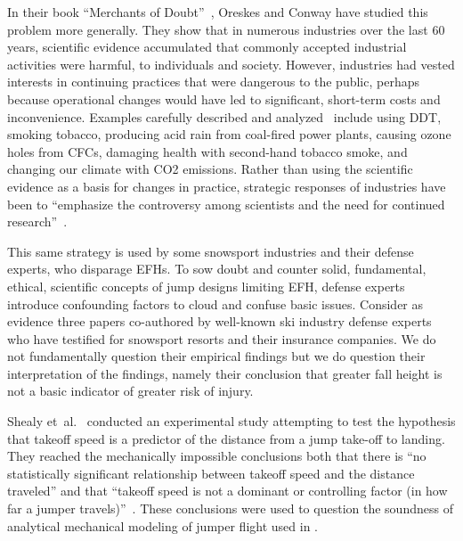 \documentclass{article}
\begin{document}
In their book ``Merchants of Doubt''~\cite{Oreskes2010}, Oreskes and Conway
have studied this problem more generally. They show that in numerous industries
over the last 60 years, scientific evidence accumulated that commonly accepted
industrial activities were harmful, to individuals and society. However,
industries had vested interests in continuing practices that were dangerous to
the public, perhaps because operational changes would have led to significant,
short-term costs and inconvenience. Examples carefully described and
analyzed~\cite{Oreskes2010} include using DDT, smoking tobacco, producing acid
rain from coal-fired power plants, causing ozone holes from  CFCs, damaging
health with second-hand tobacco smoke, and changing our climate with CO2
emissions. Rather than using the scientific evidence as a basis for changes in
practice, strategic responses of industries have been to ``emphasize the
controversy among scientists and the need for continued
research''~\cite{Oreskes2010}.

This same strategy is used by some snowsport industries and their defense
experts, who disparage EFHs.  To sow doubt and counter solid, fundamental,
ethical, scientific concepts of jump designs limiting EFH, defense experts
introduce confounding factors to cloud and confuse basic issues. Consider as
evidence three papers \cite{Shealy2010,Shealy2015,Scher2015} co-authored by
well-known ski industry defense experts who have testified for snowsport
resorts and their insurance companies. We do not fundamentally question their
empirical findings but we do question their interpretation of the findings,
namely their conclusion that greater fall height is not a basic indicator of
greater risk of injury.

Shealy et~al.~\cite{Shealy2010} conducted an experimental study attempting to
test the hypothesis that takeoff speed is a predictor of the distance from a
jump take-off to landing. They reached the mechanically impossible conclusions
both that there is ``no statistically significant relationship between takeoff
speed and the distance traveled'' and that ``takeoff speed is not a dominant or
controlling factor (in how far a jumper travels)''~\cite{Shealy2010}. These
conclusions were used to question the soundness of analytical mechanical
modeling of jumper flight used in \cite{Hubbard2009,McNeil2012}.
\end{document}
